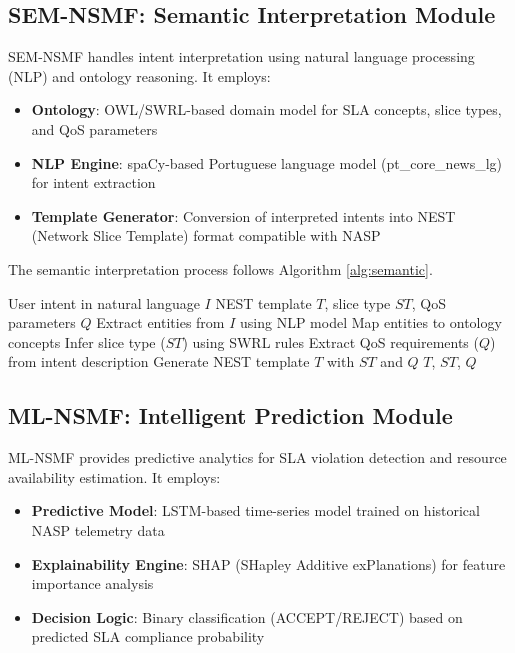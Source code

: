 \documentclass[review]{elsarticle}
\begin{document}
\subsection{SEM-NSMF: Semantic Interpretation Module}

SEM-NSMF handles intent interpretation using natural language processing (NLP) and ontology reasoning. It employs:
\begin{itemize}
    \item \textbf{Ontology}: OWL/SWRL-based domain model for SLA concepts, slice types, and QoS parameters
    \item \textbf{NLP Engine}: spaCy-based Portuguese language model (pt\_core\_news\_lg) for intent extraction
    \item \textbf{Template Generator}: Conversion of interpreted intents into NEST (Network Slice Template) format compatible with NASP
\end{itemize}

The semantic interpretation process follows Algorithm \ref{alg:semantic}.

\begin{algorithm}[h]
\caption{Semantic Intent Interpretation}
\label{alg:semantic}
\begin{algorithmic}[1]
\REQUIRE User intent in natural language $I$
\ENSURE NEST template $T$, slice type $ST$, QoS parameters $Q$
\STATE Extract entities from $I$ using NLP model
\STATE Map entities to ontology concepts
\STATE Infer slice type ($ST$) using SWRL rules
\STATE Extract QoS requirements ($Q$) from intent description
\STATE Generate NEST template $T$ with $ST$ and $Q$
\RETURN $T$, $ST$, $Q$
\end{algorithmic}
\end{algorithm}

\subsection{ML-NSMF: Intelligent Prediction Module}

ML-NSMF provides predictive analytics for SLA violation detection and resource availability estimation. It employs:
\begin{itemize}
    \item \textbf{Predictive Model}: LSTM-based time-series model trained on historical NASP telemetry data
    \item \textbf{Explainability Engine}: SHAP (SHapley Additive exPlanations) for feature importance analysis
    \item \textbf{Decision Logic}: Binary classification (ACCEPT/REJECT) based on predicted SLA compliance probability
\end{itemize}
\end{document}
